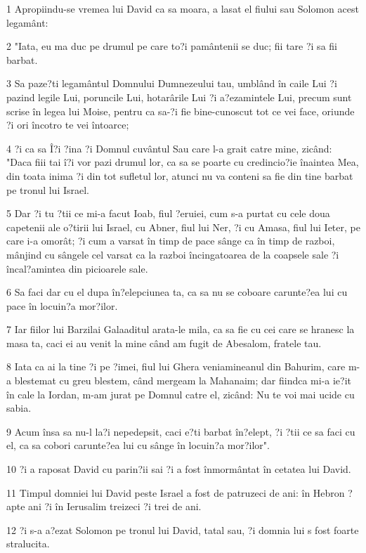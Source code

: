 \par 1 Apropiindu-se vremea lui David ca sa moara, a lasat el fiului sau Solomon acest legamânt:
\par 2 "Iata, eu ma duc pe drumul pe care to?i pamântenii se duc; fii tare ?i sa fii barbat.
\par 3 Sa paze?ti legamântul Domnului Dumnezeului tau, umblând în caile Lui ?i pazind legile Lui, poruncile Lui, hotarârile Lui ?i a?ezamintele Lui, precum sunt scrise în legea lui Moise, pentru ca sa-?i fie bine-cunoscut tot ce vei face, oriunde ?i ori încotro te vei întoarce;
\par 4 ?i ca sa Î?i ?ina ?i Domnul cuvântul Sau care l-a grait catre mine, zicând: "Daca fiii tai î?i vor pazi drumul lor, ca sa se poarte cu credincio?ie înaintea Mea, din toata inima ?i din tot sufletul lor, atunci nu va conteni sa fie din tine barbat pe tronul lui Israel.
\par 5 Dar ?i tu ?tii ce mi-a facut Ioab, fiul ?eruiei, cum s-a purtat cu cele doua capetenii ale o?tirii lui Israel, cu Abner, fiul lui Ner, ?i cu Amasa, fiul lui Ieter, pe care i-a omorât; ?i cum a varsat în timp de pace sânge ca în timp de razboi, mânjind cu sângele cel varsat ca la razboi încingatoarea de la coapsele sale ?i încal?amintea din picioarele sale.
\par 6 Sa faci dar cu el dupa în?elepciunea ta, ca sa nu se coboare carunte?ea lui cu pace în locuin?a mor?ilor.
\par 7 Iar fiilor lui Barzilai Galaaditul arata-le mila, ca sa fie cu cei care se hranesc la masa ta, caci ei au venit la mine când am fugit de Abesalom, fratele tau.
\par 8 Iata ca ai la tine ?i pe ?imei, fiul lui Ghera veniamineanul din Bahurim, care m-a blestemat cu greu blestem, când mergeam la Mahanaim; dar fiindca mi-a ie?it în cale la Iordan, m-am jurat pe Domnul catre el, zicând: Nu te voi mai ucide cu sabia.
\par 9 Acum însa sa nu-l la?i nepedepsit, caci e?ti barbat în?elept, ?i ?tii ce sa faci cu el, ca sa cobori carunte?ea lui cu sânge în locuin?a mor?ilor".
\par 10 ?i a raposat David cu parin?ii sai ?i a fost înmormântat în cetatea lui David.
\par 11 Timpul domniei lui David peste Israel a fost de patruzeci de ani: în Hebron ?apte ani ?i în Ierusalim treizeci ?i trei de ani.
\par 12 ?i s-a a?ezat Solomon pe tronul lui David, tatal sau, ?i domnia lui s fost foarte stralucita.
